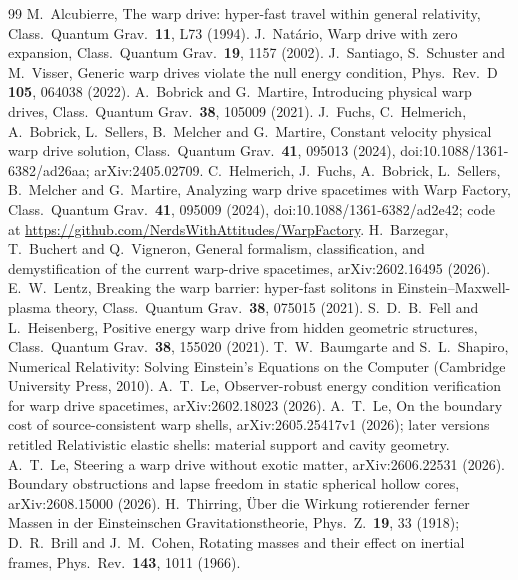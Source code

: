 \documentclass[11pt,a4paper]{article}
\theoremstyle{remark}
\begin{document}
\begin{thebibliography}{99}
 M.~Alcubierre, The warp drive: hyper-fast travel within general relativity, Class.\ Quantum Grav.\ \textbf{11}, L73 (1994).
 J.~Nat\'ario, Warp drive with zero expansion, Class.\ Quantum Grav.\ \textbf{19}, 1157 (2002).
 J.~Santiago, S.~Schuster and M.~Visser, Generic warp drives violate the null energy condition, Phys.\ Rev.\ D \textbf{105}, 064038 (2022).
 A.~Bobrick and G.~Martire, Introducing physical warp drives, Class.\ Quantum Grav.\ \textbf{38}, 105009 (2021).
 J.~Fuchs, C.~Helmerich, A.~Bobrick, L.~Sellers, B.~Melcher and G.~Martire, Constant velocity physical warp drive solution, Class.\ Quantum Grav.\ \textbf{41}, 095013 (2024), doi:10.1088/1361-6382/ad26aa; arXiv:2405.02709.
 C.~Helmerich, J.~Fuchs, A.~Bobrick, L.~Sellers, B.~Melcher and G.~Martire, Analyzing warp drive spacetimes with Warp Factory, Class.\ Quantum Grav.\ \textbf{41}, 095009 (2024), doi:10.1088/1361-6382/ad2e42; code at \url{https://github.com/NerdsWithAttitudes/WarpFactory}.
 H.~Barzegar, T.~Buchert and Q.~Vigneron, General formalism, classification, and demystification of the current warp-drive spacetimes, arXiv:2602.16495 (2026).
 E.~W.~Lentz, Breaking the warp barrier: hyper-fast solitons in Einstein--Maxwell-plasma theory, Class.\ Quantum Grav.\ \textbf{38}, 075015 (2021).
 S.~D.~B.~Fell and L.~Heisenberg, Positive energy warp drive from hidden geometric structures, Class.\ Quantum Grav.\ \textbf{38}, 155020 (2021).
 T.~W.~Baumgarte and S.~L.~Shapiro, Numerical Relativity: Solving Einstein's Equations on the Computer (Cambridge University Press, 2010).
 A.~T.~Le, Observer-robust energy condition verification for warp drive spacetimes, arXiv:2602.18023 (2026).
 A.~T.~Le, On the boundary cost of source-consistent warp shells, arXiv:2605.25417v1 (2026); later versions retitled Relativistic elastic shells: material support and cavity geometry.
 A.~T.~Le, Steering a warp drive without exotic matter, arXiv:2606.22531 (2026).
 Boundary obstructions and lapse freedom in static spherical hollow cores, arXiv:2608.15000 (2026).
 H.~Thirring, \"Uber die Wirkung rotierender ferner Massen in der Einsteinschen Gravitationstheorie, Phys.\ Z.\ \textbf{19}, 33 (1918); D.~R.~Brill and J.~M.~Cohen, Rotating masses and their effect on inertial frames, Phys.\ Rev.\ \textbf{143}, 1011 (1966).
\end{thebibliography}
\end{document}
